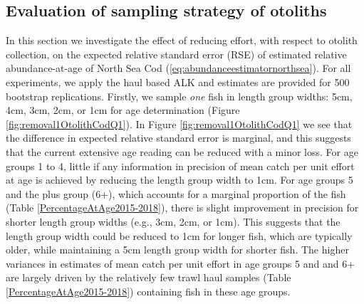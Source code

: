 \documentclass[a4paper 12pt]{article}
\numberwithin{equation}{section}
\begin{document}
\subsection{Evaluation of sampling strategy of otoliths}
\label{sec:optimumeffortresultsOtoliths}
In this section we investigate the effect of reducing effort, with respect to otolith collection, on the expected relative standard error (RSE) of estimated relative abundance-at-age of North Sea Cod (\ref{eq:abundanceestimatornorthsea}). For all experiments, we apply the haul based ALK and estimates are provided for 500 bootstrap replications. Firstly, we sample \textit{one} fish in length group widths: 5cm, 4cm, 3cm, 2cm, or 1cm for age determination (Figure \ref{fig:removal1OtolithCodQ1}).  In Figure \ref{fig:removal1OtolithCodQ1} we see that the difference in expected relative standard error is marginal, and this suggests that the current extensive age reading can be reduced with a minor loss. For age groups 1 to 4, little if any information in precision of mean catch per unit effort at age is achieved by reducing the length group width to 1cm. For age groups 5 and the plus group (6+), which accounts for a marginal proportion of the fish (Table \ref{PercentageAtAge2015-2018}), there is slight improvement in precision for shorter length group widths (e.g., 3cm, 2cm, or 1cm). This suggests that the length group width could be reduced to 1cm for longer fish, which are typically older, while maintaining a 5cm length group width for shorter fish. The higher variances in estimates of mean catch per unit effort in age groups 5 and and 6+ are largely driven by the relatively few trawl haul samples (Table \ref{PercentageAtAge2015-2018}) containing fish in these age groups. \\
\end{document}

